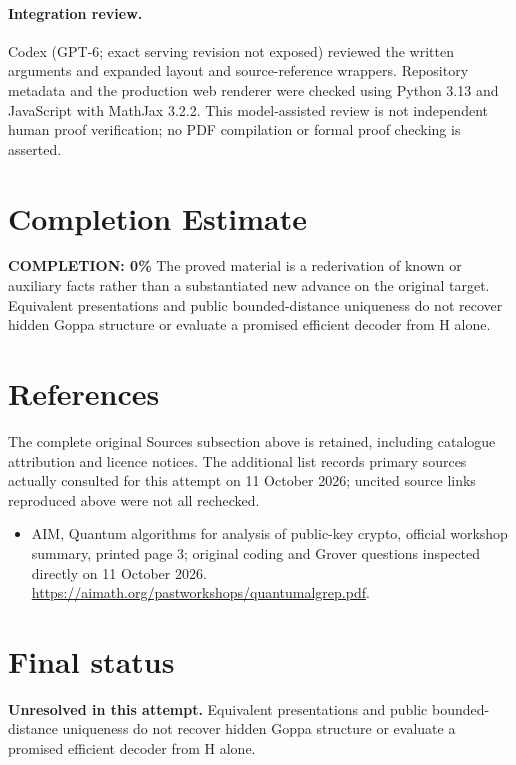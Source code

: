 \documentclass[11pt]{article}
\begin{document}
\paragraph{Integration review.} Codex (GPT-6; exact serving revision not exposed) reviewed the written arguments and expanded layout and source-reference wrappers. Repository metadata and the production web renderer were checked using Python 3.13 and JavaScript with MathJax 3.2.2. This model-assisted review is not independent human proof verification; no PDF compilation or formal proof checking is asserted.

\section{Completion Estimate}
\noindent\textbf{COMPLETION: 0\%}
The proved material is a rederivation of known or auxiliary facts rather than a substantiated new advance on the original target. Equivalent presentations and public bounded-distance uniqueness do not recover hidden Goppa structure or evaluate a promised efficient decoder from H alone.
\section{References}
The complete original Sources subsection above is retained, including catalogue attribution and licence notices. The additional list records primary sources actually consulted for this attempt on 11 October 2026; uncited source links reproduced above were not all rechecked.
\begin{itemize}
\item AIM, Quantum algorithms for analysis of public-key crypto, official workshop summary, printed page 3; original coding and Grover questions inspected directly on 11 October 2026. \url{https://aimath.org/pastworkshops/quantumalgrep.pdf}.
\end{itemize}
\section{Final status}
\textbf{Unresolved in this attempt.} Equivalent presentations and public bounded-distance uniqueness do not recover hidden Goppa structure or evaluate a promised efficient decoder from H alone.
\end{document}
